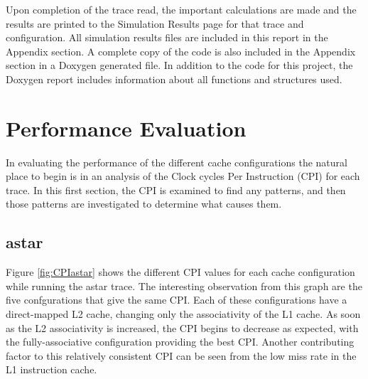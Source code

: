\documentclass[11pt,titlepage]{article}
\begin{document}
Upon completion of the trace read, the important calculations are made and the results are printed to the Simulation Results page for that trace and configuration. All simulation results files are included in this report in the Appendix section. A complete copy of the code is also included in the Appendix section in a Doxygen generated file. In addition to the code for this project, the Doxygen report includes information about all functions and structures used.

\section{Performance Evaluation}
In evaluating the performance of the different cache configurations the natural place to begin is in an analysis of the Clock cycles Per Instruction (CPI) for each trace.  In this first section, the CPI is examined to find any patterns, and then those patterns are investigated to determine what causes them.    \subsection{astar}
    Figure \ref{fig:CPIastar} shows the different CPI values for each cache configuration while running the astar trace. The interesting observation from this graph are the five confgurations that give the same CPI. Each of these configurations have a direct-mapped L2 cache, changing only the associativity of the L1 cache. As soon as the L2 associativity is increased, the CPI begins to decrease as expected, with the fully-associative configuration providing the best CPI. Another contributing factor to this relatively consistent CPI can be seen from the low miss rate in the L1 instruction cache. 
\end{document}
